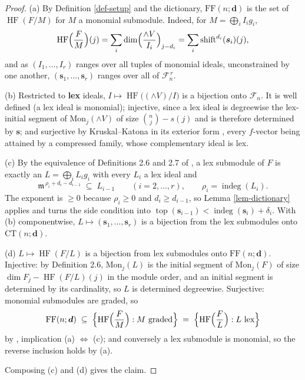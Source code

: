 \documentclass[11pt, a4paper, abstract=yes]{scrartcl}
\theoremstyle{definition}
\theoremstyle{remark}
\theoremstyle{plain}
\newcommand{\vek}[1]{\boldsymbol{#1}}
\newcommand{\shift}{\operatorname{shift}}
\newcommand{\indeg}{\operatorname{indeg}}
\newcommand{\tp}{\operatorname{top}}
\newcommand{\HF}{\operatorname{HF}}
\newcommand{\Ext}{\mathord{\wedge }V}
\begin{document}
\begin{proof}
(a) By Definition \ref{def-setup} and the dictionary, \(\mathrm{FF}(n;\vek d)\) is the set of \(\HF(F/M)\)
for \(M\) a monomial submodule. Indeed, for \(M=\bigoplus_iI_ig_i\),
\[
  \HF\Bigl(\frac FM\Bigr)(j)=\sum_i\dim\Bigl(\frac{\Ext}{I_i}\Bigr)_{j-d_i}
    =\sum_i\shift^{d_i}(\vek s_i)(j) ,
\]
and as \((I_1,\dots,I_r)\) ranges over all tuples of monomial ideals, unconstrained by one another,
\((\vek s_1,\dots,\vek s_r)\) ranges over all of \(\mathcal F_n^{\,r}\).

(b) Restricted to \textbf{lex} ideals, \(I\mapsto\HF\bigl((\Ext)/I\bigr)\) is a bijection onto \(\mathcal F_n\). It is well
defined (a lex ideal is monomial); injective, since a lex ideal is degreewise the lex-initial segment
of \(\mathrm{Mon}_j(\Ext)\) of size \(\binom nj-s(j)\) and is therefore determined by \(\vek s\); and
surjective by Kruskal--Katona in its exterior form \autocite[Theorem 4.1]{AramovaHerzogHibi1997}, every \(f\)-vector being attained by a compressed
family, whose complementary ideal is lex.

(c) By the equivalence of Definitions 2.6 and 2.7 of \autocite{AmataCrupi2020KK}, a lex submodule of \(F\) is exactly
an \(L=\bigoplus_iL_ig_i\) with every \(L_i\) a lex ideal and
\[
  \mathfrak m^{\,\rho_i+d_i-d_{i-1}}\;\subseteq\;L_{i-1}
  \qquad (i=2,\dots,r),\qquad \rho_i=\indeg(L_i) .
\]
The exponent is \(\ge0\) because \(\rho_i\ge0\) and \(d_i\ge d_{i-1}\), so
Lemma \ref{lem-dictionary} applies and turns the side condition into
\(\tp(\vek s_{i-1})<\indeg(\vek s_i)+\delta_i\). With (b) componentwise, \(L\mapsto(\vek s_1,\dots,\vek s_r)\) is a
bijection from the lex submodules onto \(\mathrm{CT}(n;\vek d)\).

(d) \(L\mapsto\HF(F/L)\) is a bijection from lex submodules onto \(\mathrm{FF}(n;\vek d)\). Injective: by
Definition 2.6, \(\mathrm{Mon}_j(L)\) is the initial segment of \(\mathrm{Mon}_j(F)\) of size
\(\dim F_j-\HF(F/L)(j)\) in the module order, and an initial segment is determined by its
cardinality, so \(L\) is determined degreewise. Surjective: monomial submodules are graded, so
\begin{equation}\label{eq:FF-in-lex}
  \mathrm{FF}(n;\vek d)\;\subseteq\;\Bigl\lbrace\HF\Bigl(\frac FM\Bigr):M\ \text{graded}\Bigr\rbrace
  \;=\;\Bigl\lbrace\HF\Bigl(\frac FL\Bigr):L\ \text{lex}\Bigr\rbrace
\end{equation}
by \autocite[Theorem 4.2]{AmataCrupi2020KK}, implication (a) \(\Leftrightarrow\) (c); and conversely a lex
submodule is monomial, so the reverse inclusion holds by (a).

Composing (c) and (d) gives the claim.
\end{proof}
\end{document}
